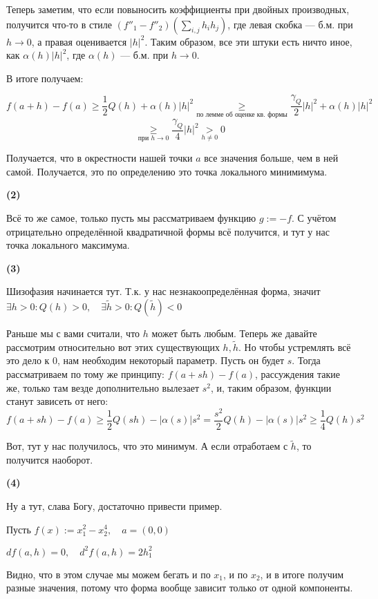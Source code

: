 \documentclass{article}
\begin{document}
Теперь заметим, что если повыносить коэффициенты при двойных производных, получится что-то в стиле $(f''_1 - f''_2)(\sum_{i, j}{h_i h_j})$, где левая скобка --- б.м. при $h \rightarrow 0$, а правая оценивается $|h|^2$. Таким образом, все эти штуки есть ничто иное, как $\alpha(h)|h|^2$, где $\alpha(h)$ --- б.м. при $h \rightarrow 0$.

В итоге получаем:

\[f(a + h) - f(a) \ge \frac{1}{2}Q(h) + \alpha(h)|h|^2 \underset{\text{по лемме об оценке кв. формы}}{\ge} \frac{\gamma_Q}{2}|h|^2 + \alpha(h)|h|^2\]
\[\underset{\text{при } h \rightarrow 0 }{\ge} \frac{\gamma_Q}{4}|h|^2 \underset{h \neq 0}{>} 0\]

Получается, что в окрестности нашей точки $a$ все значения больше, чем в ней самой. Получается, это по определению это точка локального минимимума.

\textbf{(2)}

Всё то же самое, только пусть мы рассматриваем функцию $g := -f$. С учётом отрицательно определённой квадратичной формы всё получится, и тут у нас точка локального максимума.

\textbf{(3)}

Шизофазия начинается тут. Т.к. у нас незнакоопределённая форма, значит $\exists h > 0: Q(h) > 0, \quad \exists \widetilde{h} > 0: Q(\widetilde{h}) < 0$

Раньше мы с вами считали, что $h$ может быть любым. Теперь же давайте рассмотрим относительно вот этих существующих $h, \widetilde{h}$. Но чтобы устремлять всё это дело к 0, нам необходим некоторый параметр. Пусть он будет $s$.
Тогда рассматриваем по тому же принципу: $f(a + sh) - f(a)$, рассуждения такие же, только там везде дополнительно вылезает $s^2$, и, таким образом, функции станут зависеть от него:
\[f(a + sh) - f(a) \ge \frac{1}{2}Q(sh) - |\alpha(s)|s^2 = \frac{s^2}{2}Q(h) - |\alpha(s)|s^2 \ge \frac{1}{4}Q(h)s^2\]

Вот, тут у нас получилось, что это минимум. А если отработаем с $\widetilde{h}$, то получится наоборот.

\textbf{(4)}

Ну а тут, слава Богу, достаточно привести пример.

Пусть $f(x) := x_1^2-x_2^4, \quad a = (0, 0)$

$df(a, h) = 0, \quad  d^2f(a,h) = 2h_1^2$

Видно, что в этом случае мы можем бегать и по $x_1$, и по $x_2$, и в итоге получим разные значения, потому что форма вообще зависит только от одной компоненты.
\end{document}
